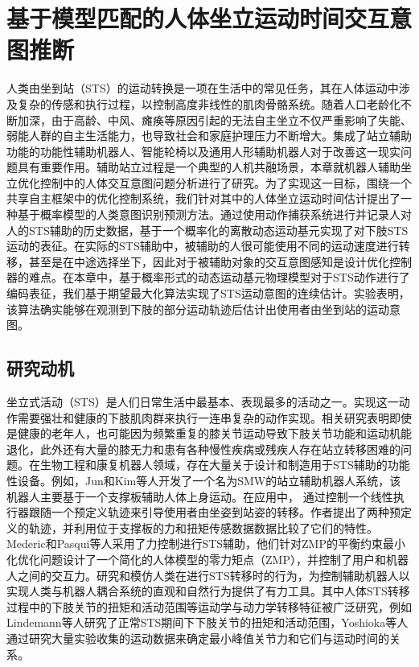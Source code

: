 \chapter{基于模型匹配的人体坐立运动时间交互意图推断}
人类由坐到站（STS）的运动转换是一项在生活中的常见任务，其在人体运动中涉及复杂的传感和执行过程，以控制高度非线性的肌肉骨骼系统。随着人口老龄化不断加深，由于高龄、中风、瘫痪等原因引起的无法自主坐立不仅严重影响了失能、弱能人群的自主生活能力，也导致社会和家庭护理压力不断增大。集成了站立辅助功能的功能性辅助机器人、智能轮椅以及通用人形辅助机器人对于改善这一现实问题具有重要作用。辅助站立过程是一个典型的人机共融场景，本章就机器人辅助坐立优化控制中的人体交互意图问题分析进行了研究。为了实现这一目标，围绕一个共享自主框架中的优化控制系统，我们针对其中的人体坐立运动时间估计提出了一种基于概率模型的人类意图识别预测方法。通过使用动作捕获系统进行并记录人对人的STS辅助的历史数据，基于一个概率化的离散动态运动基元实现了对下肢STS运动的表征。在实际的STS辅助中，被辅助的人很可能使用不同的运动速度进行转移，甚至是在中途选择坐下，因此对于被辅助对象的交互意图感知是设计优化控制器的难点。在本章中，基于概率形式的动态运动基元物理模型对于STS动作进行了编码表征，我们基于期望最大化算法实现了STS运动意图的连续估计。实验表明，该算法确实能够在观测到下肢的部分运动轨迹后估计出使用者由坐到站的运动意图。
\section{研究动机}    
坐立式活动（STS）是人们日常生活中最基本、表现最多的活动之一。实现这一动作需要强壮和健康的下肢肌肉群来执行一连串复杂的动作实现。相关研究表明即使是健康的老年人，也可能因为频繁重复的膝关节运动导致下肢关节功能和运动机能退化\cite{heidariKneeOsteoarthritisPrevalence2011}，此外还有大量的膝无力和患有各种慢性疾病或残疾人存在站立转移困难的问题。在生物工程和康复机器人领域，存在大量关于设计和制造用于STS辅助的功能性设备。例如，Jun和Kim等人\cite{hong-guljunWalkingSittostandSupport2011,inhokimKinematicAnalysisSittostand2011}开发了一个名为SMW的站立辅助机器人系统，该机器人主要基于一个支撑板辅助人体上身运动。在应用中， 通过控制一个线性执行器跟随一个预定义轨迹来引导使用者由坐姿到站姿的转移。作者提出了两种预定义的轨迹，并利用位于支撑板的力和扭矩传感数据数据比较了它们的特性。Mederic和Pasqui等人\cite{medericElderlyPeopleSit2006}采用了力控制进行STS辅助，他们针对ZMP的平衡约束最小化优化问题设计了一个简化的人体模型的零力矩点（ZMP），并控制了用户和机器人之间的交互力。研究和模仿人类在进行STS转移时的行为，为控制辅助机器人以实现人类与机器人耦合系统的直观和自然行为提供了有力工具。其中人体STS转移过程中的下肢关节的扭矩和活动范围等运动学与动力学转移特征被广泛研究，例如Lindemann等人\cite{galliQuantitativeAnalysisSit2008}研究了正常STS期间下下肢关节的扭矩和活动范围，Yoshioka等人\cite{yoshiokaBiomechanicalAnalysisRelation2009}通过研究大量实验收集的运动数据来确定最小峰值关节力和它们与运动时间的关系。

